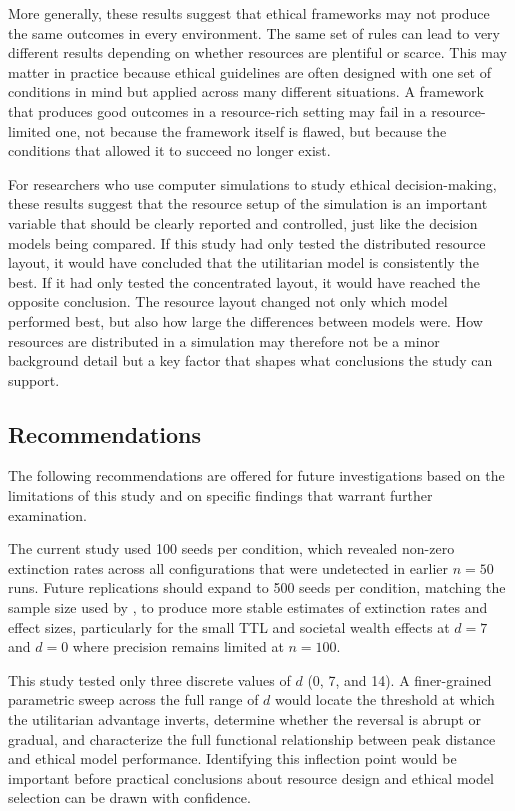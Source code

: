\documentclass{icsthesis}
\begin{document}
\begin{mainmatter}
More generally, these results suggest that ethical frameworks may not produce the same outcomes in every environment. The same set of rules can lead to very different results depending on whether resources are plentiful or scarce. This may matter in practice because ethical guidelines are often designed with one set of conditions in mind but applied across many different situations. A framework that produces good outcomes in a resource-rich setting may fail in a resource-limited one, not because the framework itself is flawed, but because the conditions that allowed it to succeed no longer exist.

For researchers who use computer simulations to study ethical decision-making, these results suggest that the resource setup of the simulation is an important variable that should be clearly reported and controlled, just like the decision models being compared. If this study had only tested the distributed resource layout, it would have concluded that the utilitarian model is consistently the best. If it had only tested the concentrated layout, it would have reached the opposite conclusion. The resource layout changed not only which model performed best, but also how large the differences between models were. How resources are distributed in a simulation may therefore not be a minor background detail but a key factor that shapes what conclusions the study can support.

		\subsection{Recommendations}

The following recommendations are offered for future investigations based on the limitations of this study and on specific findings that warrant further examination.

The current study used 100 seeds per condition, which revealed non-zero extinction rates across all configurations that were undetected in earlier $n = 50$ runs. Future replications should expand to 500 seeds per condition, matching the sample size used by \citet{KremerHerman2024}, to produce more stable estimates of extinction rates and effect sizes, particularly for the small TTL and societal wealth effects at $d = 7$ and $d = 0$ where precision remains limited at $n = 100$.

This study tested only three discrete values of $d$ (0, 7, and 14). A finer-grained parametric sweep across the full range of $d$ would locate the threshold at which the utilitarian advantage inverts, determine whether the reversal is abrupt or gradual, and characterize the full functional relationship between peak distance and ethical model performance. Identifying this inflection point would be important before practical conclusions about resource design and ethical model selection can be drawn with confidence.


\end{mainmatter}
\end{document}
